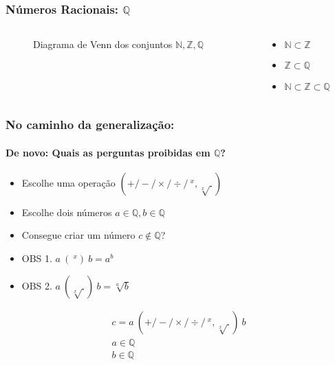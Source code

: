 \documentclass[usenames,dvipsnames,svgnames]{beamer}
\begin{document}
\begin{frame}
	
	\frametitle{Números Racionais: $\mathbb{Q}$}

	\begin{columns}[t]
	\begin{column}{.4\textwidth}
		\begin{figure}
			\def\Ncircle{		(0,0) circle (0.5cm)}
			\def\Zcircle{		(0,0) circle (1.5cm)}
			\def\Qcircle{		(0,0) circle (2.5cm)}

			\caption{Diagrama de Venn dos conjuntos $\mathbb{N}, \mathbb{Z}, \mathbb{Q}$}
		\end{figure}
	\end{column}
	\begin{column}{.6\textwidth}
		\begin{itemize}
			\item $\mathbb{N} \subset \mathbb{Z}$
			\item $\mathbb{Z} \subset \mathbb{Q}$
			\item $\mathbb{N} \subset \mathbb{Z} \subset \mathbb{Q}$
		\end{itemize}
	\end{column}
	\end{columns}

\end{frame}

\begin{frame}
	
	\frametitle{No caminho da generalização:}
	\framesubtitle{De novo: Quais as perguntas proibidas em $\mathbb{Q}$?}

	\begin{itemize}
		\item Escolhe uma operação $(+ / - / \times / \div / ~^x, \sqrt[x]{~})$
		\item Escolhe dois números $a \in \mathbb{Q}, b \in \mathbb{Q}$
		\item Consegue criar um número $c \not \in \mathbb{Q}$?
		\item OBS 1. $a ~(~^x)~ b = a^b$
		\item OBS 2. $a ~(\sqrt[x]{~})~ b = \sqrt[a]{b}$
	\end{itemize}

	\begin{equation}
	\begin{aligned}
		c = a ~ (+ / - / \times / \div / ~^x, \sqrt[x]{~}) ~ b \\
		a \in \mathbb{Q} \\
		b \in \mathbb{Q}
	\end{aligned}
	\end{equation}

\end{frame}
\end{document}
